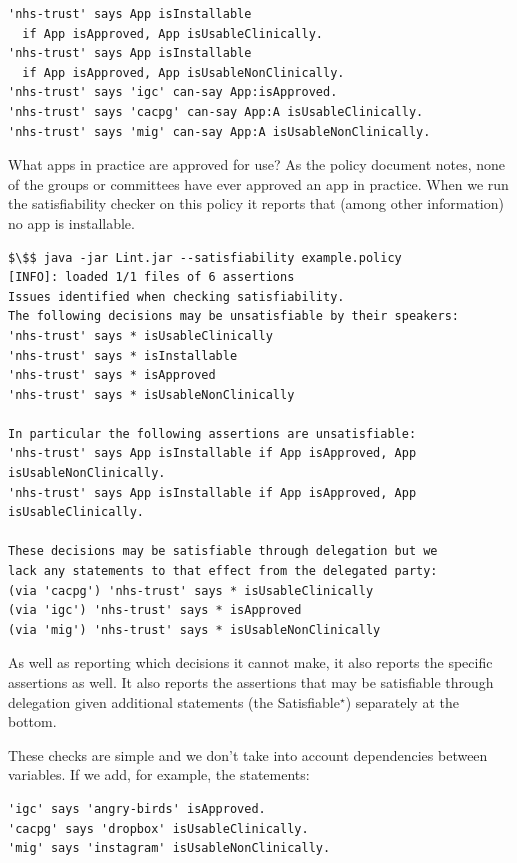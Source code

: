 \documentclass[thesis.tex]{subfiles}
\begin{document}
\begin{lstlisting}
'nhs-trust' says App isInstallable
  if App isApproved, App isUsableClinically.
'nhs-trust' says App isInstallable
  if App isApproved, App isUsableNonClinically.
'nhs-trust' says 'igc' can-say App:isApproved.
'nhs-trust' says 'cacpg' can-say App:A isUsableClinically.
'nhs-trust' says 'mig' can-say App:A isUsableNonClinically.
\end{lstlisting}

What apps in practice are approved for use?
As the policy document notes, none of the groups or committees have ever
approved an app in practice.
When we run the satisfiability checker on this policy
it reports that (among other information) no app is installable.
%
\begin{minipage}{\textwidth}
\begin{lstlisting}
$\$$ java -jar Lint.jar --satisfiability example.policy
[INFO]: loaded 1/1 files of 6 assertions
Issues identified when checking satisfiability.
The following decisions may be unsatisfiable by their speakers:
'nhs-trust' says * isUsableClinically
'nhs-trust' says * isInstallable
'nhs-trust' says * isApproved
'nhs-trust' says * isUsableNonClinically

In particular the following assertions are unsatisfiable:
'nhs-trust' says App isInstallable if App isApproved, App isUsableNonClinically.
'nhs-trust' says App isInstallable if App isApproved, App isUsableClinically.

These decisions may be satisfiable through delegation but we
lack any statements to that effect from the delegated party:
(via 'cacpg') 'nhs-trust' says * isUsableClinically
(via 'igc') 'nhs-trust' says * isApproved
(via 'mig') 'nhs-trust' says * isUsableNonClinically
\end{lstlisting}
\end{minipage}

As well as reporting which decisions it cannot make, it also reports the
specific assertions as well. It also reports the assertions that may be
satisfiable through delegation given additional statements (the
Satisfiable$^\star$) separately at the bottom.

These checks are simple and we don't take into
account dependencies between variables. If we add, for example, the statements:

\begin{lstlisting}
'igc' says 'angry-birds' isApproved.
'cacpg' says 'dropbox' isUsableClinically.
'mig' says 'instagram' isUsableNonClinically.
\end{lstlisting}
\end{document}
